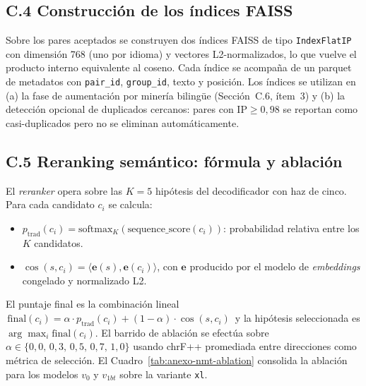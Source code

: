 \documentclass[12pt,a4paper,oneside]{book}
\begin{document}
\subsection*{C.4 Construcción de los índices FAISS}\label{anexo-nmt-faiss}

Sobre los pares aceptados se construyen dos índices FAISS \parencite{johnson2019faiss} de tipo \texttt{IndexFlatIP} con dimensión 768 (uno por idioma) y vectores L2-normalizados, lo que vuelve el producto interno equivalente al coseno. Cada índice se acompaña de un parquet de metadatos con \texttt{pair\_id}, \texttt{group\_id}, texto y posición. Los índices se utilizan en (a) la fase de aumentación por minería bilingüe (Sección~C.6, ítem~3) y (b) la detección opcional de duplicados cercanos: pares con \(\text{IP} \geq 0{,}98\) se reportan como casi-duplicados pero no se eliminan automáticamente.

\subsection*{C.5 Reranking semántico: fórmula y ablación}\label{anexo-nmt-rerank}

El \emph{reranker} opera sobre las \(K=5\) hipótesis del decodificador con haz de cinco. Para cada candidato \(c_i\) se calcula:

\begin{itemize}
  \item \(p_{\text{trad}}(c_i) = \mathrm{softmax}_K(\text{sequence\_score}(c_i))\): probabilidad relativa entre los \(K\) candidatos.
  \item \(\cos(s, c_i) = \langle \mathbf{e}(s), \mathbf{e}(c_i) \rangle\), con \(\mathbf{e}\) producido por el modelo de \emph{embeddings} congelado y normalizado L2.
\end{itemize}

El puntaje final es la combinación lineal \(\,\text{final}(c_i) = \alpha \cdot p_{\text{trad}}(c_i) + (1 - \alpha) \cdot \cos(s, c_i)\,\) y la hipótesis seleccionada es \(\arg\max_i \text{final}(c_i)\). El barrido de ablación se efectúa sobre \(\alpha \in \{0{,}0,\, 0{,}3,\, 0{,}5,\, 0{,}7,\, 1{,}0\}\) usando chrF++ promediada entre direcciones como métrica de selección. El Cuadro~\ref{tab:anexo-nmt-ablation} consolida la ablación para los modelos \(v_0\) y \(v_{1bt}\) sobre la variante \texttt{xl}.

\begin{table}[h]
\centering
\caption{Ablación de \(\alpha\) en el \emph{reranker} semántico (modelos \(v_0\) y \(v_{1bt}\), variante \texttt{xl}, conjunto de \emph{test}, métrica de selección: chrF++ promedio).}
\label{tab:anexo-nmt-ablation}

\end{table}
\end{document}
